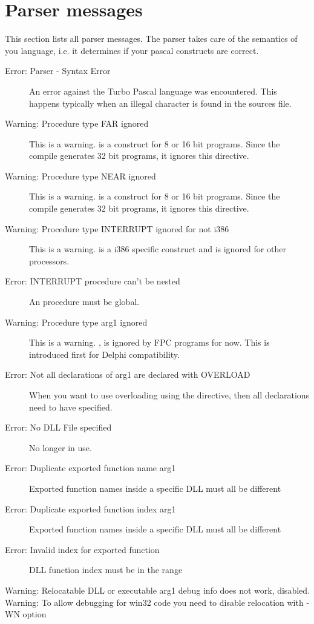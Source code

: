  \section{Parser messages}
 This section lists all parser messages. The parser takes care of the
 semantics of you language, i.e. it determines if your pascal constructs
 are correct.
 \begin{description}
\item [Error: Parser - Syntax Error]
 An error against the Turbo Pascal language was encountered. This happens
 typically when an illegal character is found in the sources file.
\item [Warning: Procedure type FAR ignored]
 This is a warning.  is a construct for 8 or 16 bit programs. Since
 the compile generates 32 bit programs, it ignores this directive.
\item [Warning: Procedure type NEAR ignored]
 This is a warning.  is a construct for 8 or 16 bit programs. Since
 the compile generates 32 bit programs, it ignores this directive.
\item [Warning: Procedure type INTERRUPT ignored for not i386]
 This is a warning.  is a i386 specific construct
 and is ignored for other processors.
\item [Error: INTERRUPT procedure can't be nested]
 An  procedure must be global.
\item [Warning: Procedure type arg1 ignored]
 This is a warning. , is ignored by FPC programs for now.
 This is introduced first for Delphi compatibility.
\item [Error: Not all declarations of arg1 are declared with OVERLOAD]
 When you want to use overloading using the  directive, then
 all declarations need to have  specified.
\item [Error: No DLL File specified]
 No longer in use.
\item [Error: Duplicate exported function name arg1]
 Exported function names inside a specific DLL must all be different
\item [Error: Duplicate exported function index arg1]
 Exported function names inside a specific DLL must all be different
\item [Error: Invalid index for exported function]
 DLL function index must be in the range 
\item [Warning: Relocatable DLL or executable arg1 debug info does not work, disabled.]
\item [Warning: To allow debugging for win32 code you need to disable relocation with -WN option]

\end{description}
